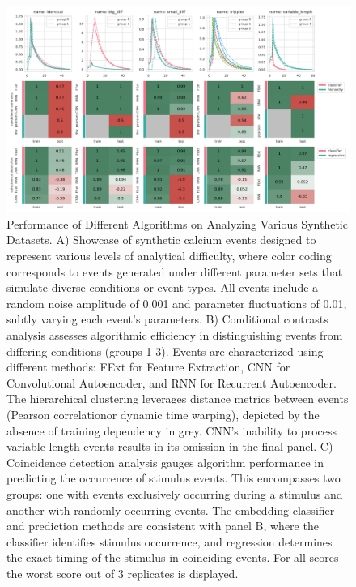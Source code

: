\begin{figure}[!htb]
\begin{center}
\includegraphics[width=\linewidth]{figures/6.png}
\end{center}
\caption{
Performance of Different Algorithms on Analyzing Various Synthetic Datasets. A) Showcase of synthetic calcium events designed to represent various levels of analytical difficulty, where color coding corresponds to events generated under different parameter sets that simulate diverse conditions or event types. All events include a random noise amplitude of 0.001 and parameter fluctuations of 0.01, subtly varying each event's parameters. B) Conditional contrasts analysis assesses algorithmic efficiency in distinguishing events from differing conditions (groups 1-3). Events are characterized using different methods: FExt for Feature Extraction, CNN for Convolutional Autoencoder, and RNN for Recurrent Autoencoder. The hierarchical clustering leverages distance metrics between events (Pearson correlationor dynamic time warping), depicted by the absence of training dependency in grey. CNN's inability to process variable-length events results in its omission in the final panel. C) Coincidence detection analysis gauges algorithm performance in predicting the occurrence of stimulus events. This encompasses two groups: one with events exclusively occurring during a stimulus and another with randomly occurring events. The embedding classifier and prediction methods are consistent with panel B, where the classifier identifies stimulus occurrence, and regression determines the exact timing of the stimulus in coinciding events. For all scores the worst score out of 3 replicates is displayed.
}\label{fig:6}
\end{figure}

